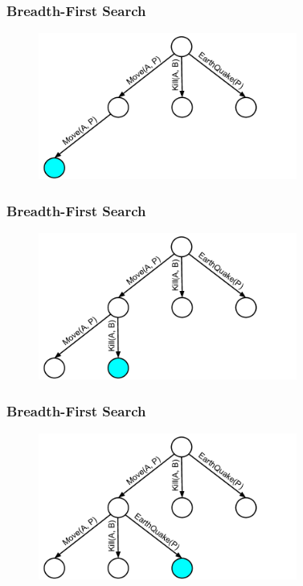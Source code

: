 \documentclass{beamer}
\begin{document}
\begin{frame}[fragile]
\frametitle{Breadth-First Search}
\begin{figure}[h]
	\includegraphics[width=8.5cm]{Diagrams/BreadthFirst/BreadthTreeFour.pdf}
	\centering
\end{figure}
\end{frame}

\begin{frame}[fragile]
\frametitle{Breadth-First Search}
\begin{figure}[h]
	\includegraphics[width=8.5cm]{Diagrams/BreadthFirst/BreadthTreeFive.pdf}
	\centering
\end{figure}
\end{frame}

\begin{frame}[fragile]
\frametitle{Breadth-First Search}
\begin{figure}[h]
	\includegraphics[width=8.5cm]{Diagrams/BreadthFirst/BreadthTreeSix.pdf}
	\centering
\end{figure}
\end{frame}
\end{document}
